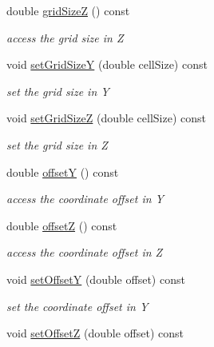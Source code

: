 \begin{DoxyCompactItemize}
double \hyperlink{class_d_d4hep_1_1_geometry_1_1_cartesian_grid_y_z_a7ffe124c102475ce9c98fa0b01d330d9}{gridSizeZ} () const 
\begin{DoxyCompactList}\small\item\em access the grid size in Z \item\end{DoxyCompactList}\item 
void \hyperlink{class_d_d4hep_1_1_geometry_1_1_cartesian_grid_y_z_a72e8d223d58503b05885bf1c8ca6f13b}{setGridSizeY} (double cellSize) const 
\begin{DoxyCompactList}\small\item\em set the grid size in Y \item\end{DoxyCompactList}\item 
void \hyperlink{class_d_d4hep_1_1_geometry_1_1_cartesian_grid_y_z_a1812722ba2ebf57c0e08f40fa1740dae}{setGridSizeZ} (double cellSize) const 
\begin{DoxyCompactList}\small\item\em set the grid size in Z \item\end{DoxyCompactList}\item 
double \hyperlink{class_d_d4hep_1_1_geometry_1_1_cartesian_grid_y_z_a00b47c15cf9fd27761e2a7c3e1b4b7db}{offsetY} () const 
\begin{DoxyCompactList}\small\item\em access the coordinate offset in Y \item\end{DoxyCompactList}\item 
double \hyperlink{class_d_d4hep_1_1_geometry_1_1_cartesian_grid_y_z_aa7bdd306e50ec2ff182cb51f3ce4704f}{offsetZ} () const 
\begin{DoxyCompactList}\small\item\em access the coordinate offset in Z \item\end{DoxyCompactList}\item 
void \hyperlink{class_d_d4hep_1_1_geometry_1_1_cartesian_grid_y_z_a7399a2d921fb91e013cedacb0571394b}{setOffsetY} (double offset) const 
\begin{DoxyCompactList}\small\item\em set the coordinate offset in Y \item\end{DoxyCompactList}\item 
void \hyperlink{class_d_d4hep_1_1_geometry_1_1_cartesian_grid_y_z_ab079e1c43643989e382a47e3b8459f99}{setOffsetZ} (double offset) const 

\end{DoxyCompactItemize}
